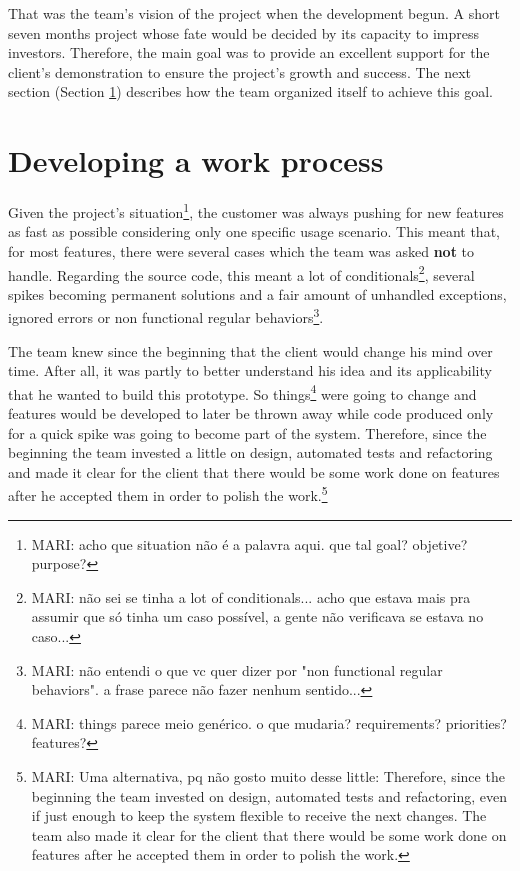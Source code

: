 \documentclass[lnbip]{svmultln}
\newcommand{\mari}[1]{\footnote{MARI: #1}}
\begin{document}
That was the team's vision of the project when the development
begun. A short seven months project whose fate would be decided by its
capacity to impress investors. Therefore, the main goal was to provide
an excellent support for the client's demonstration to ensure the
project's growth and success. The next section (Section
\ref{sec:working}) describes how the team organized itself to achieve
this goal.

\section{Developing a work process}
\label{sec:working}

Given the project's situation\mari{acho que situation não é a palavra aqui. que tal goal? objetive? purpose?}, the customer was always pushing for new features as fast as possible considering only one specific usage scenario. This meant that, for most features, there were several cases which the team was asked \textbf{not} to handle. Regarding the source code, this meant a lot of conditionals\mari{não sei se tinha a lot of conditionals... acho que estava mais pra assumir que só tinha um caso possível, a gente não verificava se estava no caso...}, several spikes becoming permanent solutions and a fair amount of unhandled exceptions, ignored errors or non functional regular behaviors\mari{não entendi o que vc quer dizer por "non functional regular behaviors". a frase parece não fazer nenhum sentido...}.

The team knew since the beginning that the client would change his mind over time. After all, it was partly to better understand his idea and its applicability that he wanted to build this prototype. So things\mari{things parece meio genérico. o que mudaria? requirements? priorities? features?} were going to change and features would be developed to later be thrown away while code produced only for a quick spike was going to become part of the system. Therefore, since the beginning the team invested a little on design, automated tests and refactoring and made it clear for the client that there would be some work done on features after he accepted them in order to polish the work.\mari{Uma alternativa, pq não gosto muito desse little: Therefore, since the beginning the team invested on design, automated tests and refactoring, even if just enough to keep the system flexible to receive the next changes. The team also made it clear for the client that there would be some work done on features after he accepted them in order to polish the work.}
\end{document}
